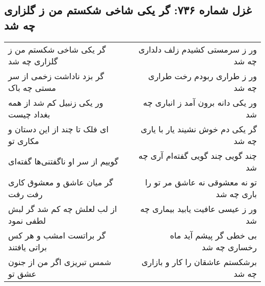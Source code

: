 \begin{center}
\section*{غزل شماره ۷۳۶: گر یکی شاخی شکستم من ز گلزاری چه شد}
\label{sec:0736}
\begin{longtable}{l p{0.5cm} r}
گر یکی شاخی شکستم من ز گلزاری چه شد
&&
ور ز سرمستی کشیدم زلف دلداری چه شد
\\
گر بزد ناداشت زخمی از سر مستی چه باک
&&
ور ز طراری ربودم رخت طراری چه شد
\\
ور یکی زنبیل کم شد از همه بغداد چیست
&&
ور یکی دانه برون آمد ز انباری چه شد
\\
ای فلک تا چند از این دستان و مکاری تو
&&
گر یکی دم خوش نشیند یار با یاری چه شد
\\
گوییم از سر او ناگفتنی‌ها گفته‌ای
&&
چند گویی چند گویی گفته‌ام آری چه شد
\\
گر میان عاشق و معشوق کاری رفت رفت
&&
تو نه معشوقی نه عاشق مر تو را باری چه شد
\\
از لب لعلش چه کم شد گر لبش لطفی نمود
&&
ور ز عیسی عافیت یابید بیماری چه شد
\\
گر براتست امشب و هر کس براتی یافتند
&&
بی خطی گر پیشم آید ماه رخساری چه شد
\\
شمس تبریزی اگر من از جنون عشق تو
&&
برشکستم عاشقان را کار و بازاری چه شد
\\
\end{longtable}
\end{center}
